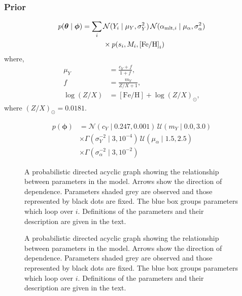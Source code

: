 \documentclass[fleqn,usenatbib]{mnras}
\newcommand{\normaldist}{\mathcal{N}}
\newcommand{\uniformdist}{\mathcal{U}}
\newcommand{\gammadist}{\Gamma}
\renewcommand*{\vec}[1]{\boldsymbol{#1}}
\newcommand{\dydz}{\ensuremath{m_Y}}
\newcommand{\yp}{\ensuremath{c_Y}}
\newcommand{\eep}{\ensuremath{s}}
\newcommand{\feh}{\ensuremath{\mathrm{[Fe/H]}}}
\newcommand{\mlt}[1][]{{\ensuremath{\alpha_{\mathrm{mlt} \ifx#1\empty \else , #1 \fi}}}}
\begin{document}
\subsubsection{Prior}

\begin{equation}
    \begin{split}
        p(\vec{\theta} \mid \vec\phi) = \sum_i \, &\normaldist(Y_i \mid \mu_Y, \sigma_Y^2) \, \normaldist(\mlt[i] \mid \mu_\alpha, \sigma_\alpha^2) \\
        &\times p(\eep_i, M_i, \feh_i)
    \end{split}
\end{equation}
%
where,
%
\begin{align}
    \mu_Y &= \frac{\yp + f}{1 + f}, \\
    f &= \frac{\dydz}{Z / X + 1}, \\
    \log({Z}/{X}) &= \feh + \log({Z}/{X})_\odot,
\end{align}
%
where \((Z/X)_\odot = 0.0181\).

%
\begin{equation}
    \begin{split}
        p(\vec\phi) &= \normaldist(\yp \mid 0.247, 0.001) \, \uniformdist(\dydz \mid 0.0, 3.0) \\
        &\times \gammadist(\sigma_Y^{-2} \mid 3, 10^{-4}) \, \uniformdist(\mu_\alpha \mid 1.5, 2.5) \\
        &\times \gammadist(\sigma_\alpha^{-2} \mid 3, 10^{-2})
    \end{split}
\end{equation}

\begin{figure}
    \centering
    
    \caption{A probabilistic directed acyclic graph showing the relationship between parameters in the model. Arrows show the direction of dependence.
    Parameters shaded grey are observed and those represented by black dots are fixed. 
    The blue box groups parameters which loop over \(i\). Definitions of the parameters and their description are given in the text.
    }
\end{figure}

\begin{figure}
    \centering
    
    \caption{A probabilistic directed acyclic graph showing the relationship between parameters in the model. Arrows show the direction of dependence.
    Parameters shaded grey are observed and those represented by black dots are fixed. 
    The blue box groups parameters which loop over \(i\). Definitions of the parameters and their description are given in the text.
    }
\end{figure}
\end{document}
